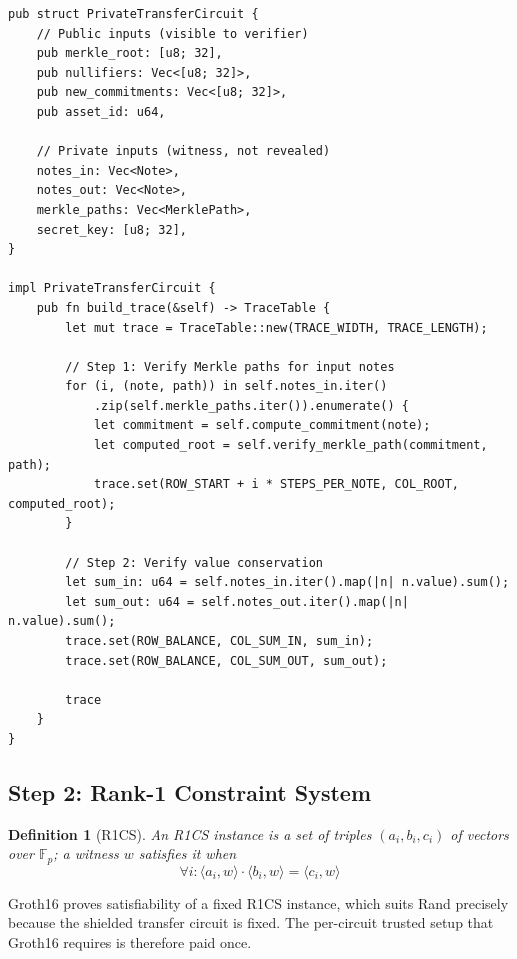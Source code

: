 \documentclass[11pt,a4paper]{article}
\newtheorem{definition}[theorem]{Definition}
\begin{document}
\begin{lstlisting}[caption=Private Transfer Circuit Definition]
pub struct PrivateTransferCircuit {
    // Public inputs (visible to verifier)
    pub merkle_root: [u8; 32],
    pub nullifiers: Vec<[u8; 32]>,
    pub new_commitments: Vec<[u8; 32]>,
    pub asset_id: u64,
    
    // Private inputs (witness, not revealed)
    notes_in: Vec<Note>,
    notes_out: Vec<Note>,
    merkle_paths: Vec<MerklePath>,
    secret_key: [u8; 32],
}

impl PrivateTransferCircuit {
    pub fn build_trace(&self) -> TraceTable {
        let mut trace = TraceTable::new(TRACE_WIDTH, TRACE_LENGTH);
        
        // Step 1: Verify Merkle paths for input notes
        for (i, (note, path)) in self.notes_in.iter()
            .zip(self.merkle_paths.iter()).enumerate() {
            let commitment = self.compute_commitment(note);
            let computed_root = self.verify_merkle_path(commitment, path);
            trace.set(ROW_START + i * STEPS_PER_NOTE, COL_ROOT, computed_root);
        }
        
        // Step 2: Verify value conservation
        let sum_in: u64 = self.notes_in.iter().map(|n| n.value).sum();
        let sum_out: u64 = self.notes_out.iter().map(|n| n.value).sum();
        trace.set(ROW_BALANCE, COL_SUM_IN, sum_in);
        trace.set(ROW_BALANCE, COL_SUM_OUT, sum_out);
        
        trace
    }
}
\end{lstlisting}

\subsection{Step 2: Rank-1 Constraint System}

\begin{definition}[R1CS]
An R1CS instance is a set of triples $(a_i, b_i, c_i)$ of vectors over $\mathbb{F}_p$; a witness $w$ satisfies it when
\begin{equation}
\forall i : \langle a_i, w \rangle \cdot \langle b_i, w \rangle = \langle c_i, w \rangle
\end{equation}
\end{definition}

Groth16 proves satisfiability of a fixed R1CS instance, which suits Rand precisely because the shielded transfer circuit is fixed. The per-circuit trusted setup that Groth16 requires is therefore paid once.
\end{document}
